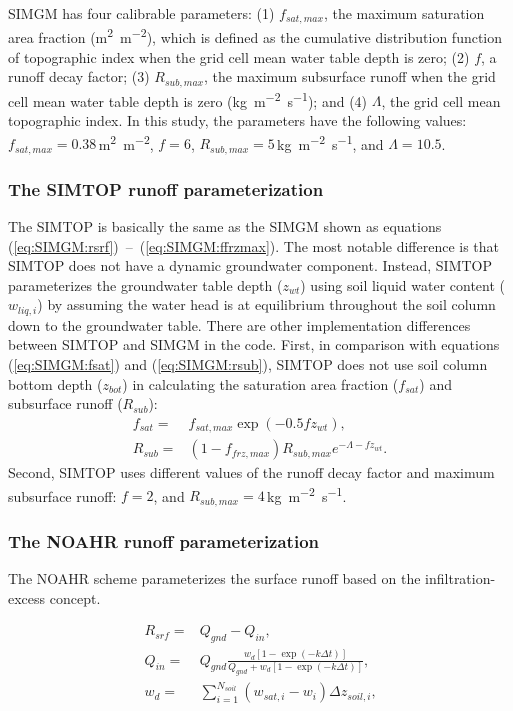 \documentclass[essd]{copernicus}
\begin{document}
SIMGM has four calibrable parameters: (1) $f_{sat,max}$, the maximum saturation area fraction (\unit{m^2~m^{-2}}), which is defined as the cumulative distribution function of topographic index when the grid cell mean water table depth is zero; (2) $f$, a runoff decay factor; (3) $R_{sub,max}$, the maximum subsurface runoff when the grid cell mean water table depth is zero (\unit{kg~m^{-2}~s^{-1}}); and (4) $\Lambda$, the grid cell mean topographic index. In this study, the parameters have the following values: $f_{sat,max} = 0.38$\,\unit{m^2~m^{-2}}, $f=6$, $R_{sub,max} = 5$\,\unit{kg~m^{-2}~s^{-1}}, and $\Lambda = 10.5$.

\subsubsection{The SIMTOP runoff parameterization}

The SIMTOP is basically the same as the SIMGM shown as equations (\ref{eq:SIMGM:rsrf})~--~(\ref{eq:SIMGM:ffrzmax}). The most notable difference is that SIMTOP does not have a dynamic groundwater component. Instead, SIMTOP parameterizes the groundwater table depth ($z_{wt}$) using soil liquid water content ($w_{liq,i}$) by assuming the water head is at equilibrium throughout the soil column down to the groundwater table. There are other implementation differences between SIMTOP and SIMGM in the code. First, in comparison with equations (\ref{eq:SIMGM:fsat}) and (\ref{eq:SIMGM:rsub}), SIMTOP does not use soil column bottom depth ($z_{bot}$) in calculating the saturation area fraction ($f_{sat}$) and subsurface runoff ($R_{sub}$):
\begin{align}
    f_{sat} = & f_{sat,max} \exp(-0.5 f z_{wt}) \text{,} \\
    R_{sub} = & (1-f_{frz,max}) R_{sub,max} e^{-\Lambda-f z_{wt}} \text{.}
\end{align}
Second, SIMTOP uses different values of the runoff decay factor and maximum subsurface runoff: $f=2$, and $R_{sub,max} = 4$\,\unit{kg~m^{-2}~s^{-1}}.


\subsubsection{The NOAHR runoff parameterization}

The NOAHR scheme parameterizes the surface runoff based on the infiltration-excess concept.

\begin{align}
    R_{srf} = & Q_{gnd} - Q_{in} \text{,} \\
    Q_{in} =  & Q_{gnd} \frac{w_d [1-\exp(-k\Delta t)]}{Q_{gnd} + w_d [1 - \exp(-k\Delta t)]} \text{,} \\
    w_d =     & \sum_{i=1}^{N_{soil}} (w_{sat,i} - w_i) \Delta z_{soil,i} \text{,}
\end{align}
\end{document}
